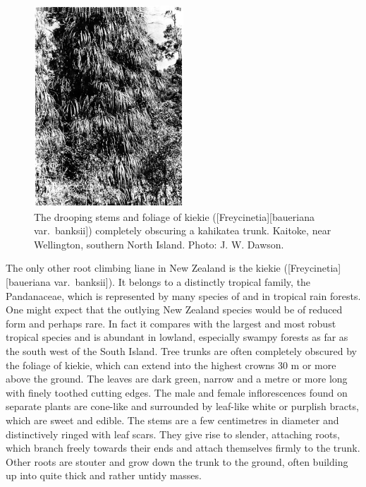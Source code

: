 \begin{figure}
	\includegraphics[width=0.5\textwidth]{graphics/figure32kiekie.jpg}
	\centering
	\caption[The drooping stems and foliage of kiekie]{The drooping stems and foliage of kiekie ([Freycinetia][baueriana var.\ banksii]) completely obscuring a kahikatea trunk. Kaitoke, near Wellington, southern North Island. Photo: J. W. Dawson.}%
	\label{fig:32kiekie}
\end{figure}

The only other root climbing liane in New Zealand is the kiekie ([Freycinetia][baueriana var.\ banksii]).
It belongs to a distinctly tropical family, the Pandanaceae, which is represented by many species of  and  in tropical rain forests.
One might expect that the outlying New Zealand species would be of reduced form and perhaps rare.
In fact it compares with the largest and most robust tropical species and is abundant in lowland, especially swampy forests as far as the south west of the South Island.
Tree trunks are often completely obscured by the foliage of kiekie, which can extend into the highest crowns 30 m or more above the ground.
The leaves are dark green, narrow and a metre or more long with finely toothed cutting edges.
The male and female inflorescences found on separate plants are cone-like and surrounded by leaf-like white or purplish bracts, which are sweet and edible.
The stems are a few centimetres in diameter and distinctively ringed with leaf scars.
They give rise to slender, attaching roots, which branch freely towards their ends and attach themselves firmly to the trunk.
Other roots are stouter and grow down the trunk to the ground, often building up into quite thick and rather untidy masses.

